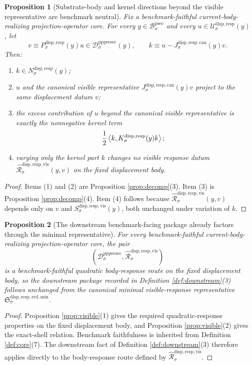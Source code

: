 \documentclass[11pt]{article}
\newcommand{\ProtoSectionBody}[1]{\mathcal B_{#1}^{\mathrm{psec}}}
\newcommand{\PrePreProtoSectionResidualBody}[1]{\mathcal D_{#1}^{\mathrm{pppresec}}}
\newcommand{\CoreForcedBodyResponse}[1]{\widehat{\mathscr R}_{#1}^{\mathrm{disp,resp,vis}}}
\newcommand{\SubstrateBody}[1]{\mathcal U_{#1}^{\mathrm{disp,resp}}}
\newcommand{\SubstrateProjection}[1]{P_{#1}^{\mathrm{disp,resp}}}
\newcommand{\SubstrateOperator}[1]{K_{#1}^{\mathrm{disp,resp}}}
\newcommand{\SubstrateKernel}[1]{N_{#1}^{\mathrm{disp,resp}}}
\newcommand{\VisibleResponseOperator}[1]{S_{#1}^{\mathrm{disp,resp,vis}}}
\newcommand{\CanonicalLift}[1]{J_{#1}^{\mathrm{disp,resp,can}}}
\newcommand{\MinimalReducedStructure}{\mathfrak S^{\mathrm{disp,resp,red,min}}}
\newtheorem{proposition}{Proposition}
\begin{document}
\begin{proposition}[Substrate-body and kernel directions beyond the visible representative are benchmark neutral]
\label{prop:neutral}
Fix a benchmark-faithful current-body-realizing projection-operator core. For every \(y\in\ProtoSectionBody{\sigma}\) and every \(u\in\SubstrateBody{\sigma}(y)\), let
\[
v\equiv\SubstrateProjection{\sigma}(y)u
\in
\PrePreProtoSectionResidualBody{\sigma}(y),
\qquad
k\equiv u-\CanonicalLift{\sigma}(y)v.
\]
Then:
\begin{enumerate}
    \item \(k\in\SubstrateKernel{\sigma}(y)\);
    \item \(u\) and the canonical visible representative \(\CanonicalLift{\sigma}(y)v\) project to the same displacement datum \(v\);
    \item the excess contribution of \(u\) beyond the canonical visible representative is exactly the nonnegative kernel term
    \[
    \frac{1}{2}\ev{k,\SubstrateOperator{\sigma}(y)k};
    \]
    \item varying only the kernel part \(k\) changes no visible response datum \(\CoreForcedBodyResponse{\sigma}(y,v)\) on the fixed displacement body.
\end{enumerate}
\end{proposition}

\begin{proof}
Items (1) and (2) are Proposition \ref{prop:decomp}(3). Item (3) is Proposition \ref{prop:decomp}(4). Item (4) follows because \(\CoreForcedBodyResponse{\sigma}(y,v)\) depends only on \(v\) and \(\VisibleResponseOperator{\sigma}(y)\), both unchanged under variation of \(k\).
\end{proof}

\begin{proposition}[The downstream benchmark-facing package already factors through the minimal representative]
\label{prop:downstream}
For every benchmark-faithful current-body-realizing projection-operator core, the pair
\[
\left(
\PrePreProtoSectionResidualBody{\sigma},
\CoreForcedBodyResponse{\sigma}
\right)
\]
is a benchmark-faithful quadratic body-response route on the fixed displacement body, so the downstream package recorded in Definition \ref{def:downstream}(3) follows unchanged from the canonical minimal visible-response representative \(\MinimalReducedStructure_{\sigma}\).
\end{proposition}

\begin{proof}
Proposition \ref{prop:visible}(1) gives the required quadratic-response properties on the fixed displacement body, and Proposition \ref{prop:visible}(2) gives the exact-shell relation. Benchmark faithfulness is inherited from Definition \ref{def:core}(7). The downstream fact of Definition \ref{def:downstream}(3) therefore applies directly to the body-response route defined by \(\CoreForcedBodyResponse{\sigma}\).
\end{proof}
\end{document}
